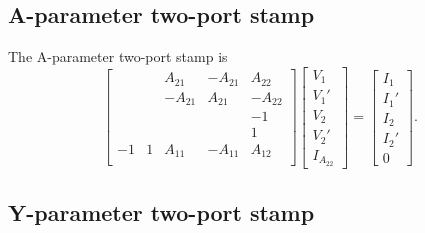 \documentclass[a4paper, 12pt]{article}
\begin{document}
\subsection{A-parameter two-port stamp}

The A-parameter two-port stamp is
%
\begin{equation}
  \begin{bmatrix}
   &   &  A_{21} & -A_{21} & A_{22} \\
   &   & -A_{21} & A_{21}  & -A_{22} \\
   &   &         &        & -1    \\
   &   &         &        &  1    \\
   -1 & 1  & A_{11} & -A_{11} & A_{12} \\
  \end{bmatrix}
  \begin{bmatrix}
    V_1 \\ V_1' \\ V_2 \\ V_2' \\ I_{A_{22}}
  \end{bmatrix}
=
\begin{bmatrix}
  I_1 \\ I_1' \\ I_2 \\ I_2' \\ 0
\end{bmatrix}.
\end{equation}
%
%



\subsection{Y-parameter two-port stamp}
\end{document}
